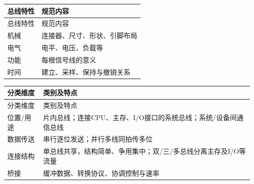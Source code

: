 \par\smallskip
{\fontsize{9.3}{12}\selectfont\setlength{\tabcolsep}{2.5pt}\setlength{\LTleft}{0pt}\setlength{\LTright}{0pt}
\begin{longtable}{@{}>{\raggedright\arraybackslash}p{}>{\raggedright\arraybackslash}p{}@{}}
\toprule
总线特性 & 规范内容 \\

\midrule\endfirsthead\toprule
总线特性 & 规范内容 \\

\midrule\endhead\bottomrule\endfoot
机械 & 连接器、尺寸、形状、引脚布局 \\

电气 & 电平、电压、负载等 \\

功能 & 每根信号线的意义 \\

时间 & 建立、采样、保持与撤销关系 \\

\end{longtable}}
\par\smallskip

\par\smallskip
{\fontsize{9.3}{12}\selectfont\setlength{\tabcolsep}{2.5pt}\setlength{\LTleft}{0pt}\setlength{\LTright}{0pt}
\begin{longtable}{@{}>{\raggedright\arraybackslash}p{}>{\raggedright\arraybackslash}p{}@{}}
\toprule
分类维度 & 类别及特点 \\

\midrule\endfirsthead\toprule
分类维度 & 类别及特点 \\

\midrule\endhead\bottomrule\endfoot
位置/用途 & 片内总线；连接CPU、主存、I/O接口的系统总线；系统/设备间通信总线 \\

数据传送 & 串行逐位发送；并行多线同拍传多位 \\

连接结构 & 单总线共享，结构简单、争用集中；双/三/多总线分离主存及I/O等流量 \\

桥接 & 缓冲数据、转换协议、协调控制与速率 \\

\end{longtable}}
\par\smallskip

